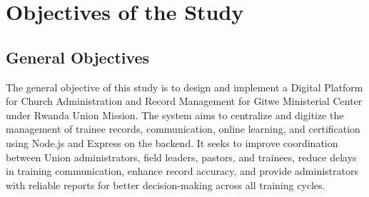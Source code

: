 \documentclass[12pt]{report}
\begin{document}
\section{Objectives of the Study}

\subsection{General Objectives}
The general objective of this study is to design and implement a Digital Platform for Church Administration and Record Management for Gitwe Ministerial Center under Rwanda Union Mission. The system aims to centralize and digitize the management of trainee records, communication, online learning, and certification using Node.js and Express on the backend. It seeks to improve coordination between Union administrators, field leaders, pastors, and trainees, reduce delays in training communication, enhance record accuracy, and provide administrators with reliable reports for better decision-making across all training cycles.
\end{document}
